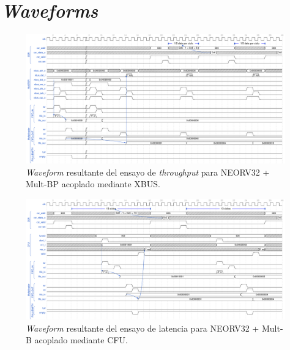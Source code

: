 
\chapter{\textit{Waveforms}} %

\label{wave} 

\begin{figure}[h!]
    \centering
    \includegraphics[width=17cm,angle=90]{Figuras/wave-xbus.pdf}
    \caption{\textit{Waveform} resultante del ensayo de \textit{throughput} para NEORV32 + Mult-BP acoplado mediante XBUS.}
    \label{wave:xbus}
\end{figure}

\newpage

\begin{figure}[h!]
    \centering
    \includegraphics[width=22cm,angle=90]{Figuras/wave-cfu.pdf}
    \caption{\textit{Waveform} resultante del ensayo de latencia para NEORV32 + Mult-B acoplado mediante CFU.}
    \label{wave:cfu}
\end{figure}
